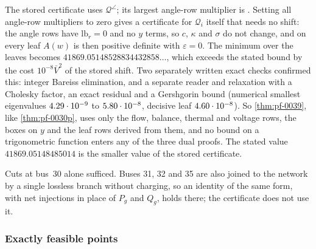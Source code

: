 \begin{remark}\label{rem:pf-anglefree}
The stored  certificate uses $\mathcal Q^\angle$; its largest angle-row multiplier is .
Setting all angle-row multipliers to zero gives a certificate for $\mathcal Q_i$ itself that needs no shift:
the angle rows have $\mathrm{lb}_r=0$ and no $y$ terms, so $c$, $\kappa$ and $\sigma$ do not change, and on every leaf $A(w)$ is then positive definite with $\varepsilon=0$.
The minimum over the leaves becomes $41869.05148528834432858\ldots$, which exceeds the stated bound by the cost $10^{-8}\bar V^2$ of the stored shift.
Two separately written exact checks confirmed this: integer Bareiss elimination, and a separate reader and relaxation with a Cholesky factor, an exact residual and a Gershgorin bound (numerical smallest eigenvalues $4.29\cdot 10^{-9}$ to $5.80\cdot 10^{-8}$, decisive leaf $4.60\cdot 10^{-8}$).
So \cref{thm:pf-0039}, like \cref{thm:pf-0030p}, uses only the flow, balance, thermal and voltage rows, the boxes on $y$ and the leaf rows derived from them, and no bound on a trigonometric function enters any of the three dual proofs.
The stated value $41869.05148485014$ is the smaller value of the stored certificate.
\end{remark}

Cuts at bus~30 alone sufficed.
Buses 31, 32 and 35 are also joined to the network by a single lossless branch without charging, so an identity of the same form, with net injections in place of $P_g$ and $Q_g$, holds there; the certificate does not use it.

\subsubsection{Exactly feasible points}\label{app:powerflow-points}

